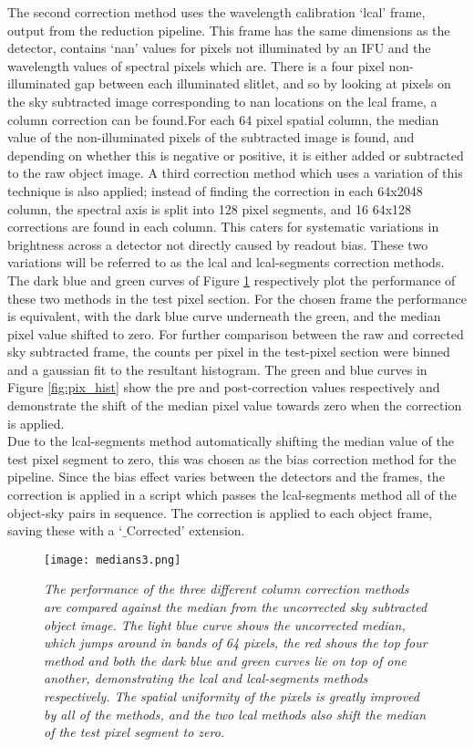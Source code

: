 \documentclass{literature}
\begin{document}
The second correction method uses the wavelength calibration `lcal' frame, output from the reduction pipeline. This frame has the same dimensions as the detector, contains `nan' values for pixels not illuminated by an IFU and the wavelength values of spectral pixels which are. There is a four pixel non-illuminated gap between each illuminated slitlet, and so by looking at pixels on the sky subtracted image corresponding to nan locations on the lcal frame, a column correction can be found.For each 64 pixel spatial column, the median value of the non-illuminated pixels of the subtracted image is found, and depending on whether this is negative or positive, it is either added or subtracted to the raw object image. A third correction method which uses a variation of this technique is also applied; instead of finding the correction in each 64x2048 column, the spectral axis is split into 128 pixel segments, and 16 64x128 corrections are found in each column. This caters for systematic variations in brightness across a detector not directly caused by readout bias. These two variations will be referred to as the lcal and lcal-segments correction methods. The dark blue and green curves of Figure \ref{fig:med_corr} respectively plot the performance of these two methods in the test pixel section. For the chosen frame the performance is equivalent, with the dark blue curve underneath the green, and the median pixel value shifted to zero. For further comparison between the raw and corrected sky subtracted frame, the counts per pixel in the test-pixel section were binned and a gaussian fit to the resultant histogram. The green and blue curves in Figure \ref{fig:pix_hist} show the pre and post-correction values respectively and demonstrate the shift of the median pixel value towards zero when the correction is applied.    \\       

Due to the lcal-segments method automatically shifting the median value of the test pixel segment to zero, this was chosen as the bias correction method for the pipeline. Since the bias effect varies between the detectors and the frames, the correction is applied in a script which passes the lcal-segments method all of the object-sky pairs in sequence. The correction is applied to each object frame, saving these with a `$\_$Corrected' extension.  


\begin{figure}[!htp]
\centering
\texttt{[image: medians3.png]}
\caption{\footnotesize{\emph{The performance of the three different column correction methods are compared against the median from the uncorrected sky subtracted object image. The light blue curve shows the uncorrected median, which jumps around in bands of 64 pixels, the red shows the top four method and both the dark blue and green curves lie on top of one another, demonstrating the lcal and lcal-segments methods respectively. The spatial uniformity of the pixels is greatly improved by all of the methods, and the two lcal methods also shift the median of the test pixel segment to zero.}}}
\label{fig:med_corr}
\end{figure}
\end{document}
